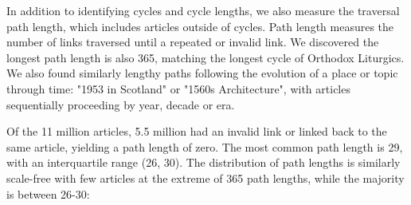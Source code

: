 \documentclass[twoside]{article}
\begin{document}
In addition to identifying cycles and cycle lengths, we also measure the traversal path length, which includes articles outside
of cycles. 
Path length measures the number of links traversed until a repeated or invalid link. 
We discovered the longest path length is also 365, matching the longest cycle of Orthodox Liturgics. 
We also found similarly lengthy paths following the evolution of a place or topic through time: 
"1953 in Scotland" or "1560s Architecture", with articles sequentially proceeding by year, decade or era.

Of the 11 million articles, 5.5 million had an invalid link or linked back to the same article, yielding a path length of zero. 
The most common path length is 29, with an interquartile range (26, 30).
The distribution of path lengths is similarly scale-free with few articles at the extreme of 365 path lengths, while the majority 
is between 26-30: 
\end{document}
